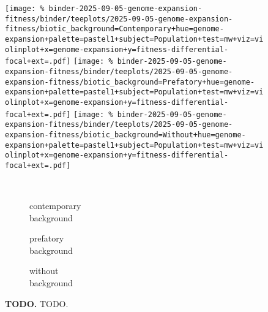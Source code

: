 \begin{figure}

\texttt{[image: \%
binder-2025-09-05-genome-expansion-fitness/binder/teeplots/2025-09-05-genome-expansion-fitness/biotic\_background=Contemporary+hue=genome-expansion+palette=pastel1+subject=Population+test=mw+viz=violinplot+x=genome-expansion+y=fitness-differential-focal+ext=.pdf]}
\texttt{[image: \%
binder-2025-09-05-genome-expansion-fitness/binder/teeplots/2025-09-05-genome-expansion-fitness/biotic\_background=Prefatory+hue=genome-expansion+palette=pastel1+subject=Population+test=mw+viz=violinplot+x=genome-expansion+y=fitness-differential-focal+ext=.pdf]}%
\texttt{[image: \%
binder-2025-09-05-genome-expansion-fitness/binder/teeplots/2025-09-05-genome-expansion-fitness/biotic\_background=Without+hue=genome-expansion+palette=pastel1+subject=Population+test=mw+viz=violinplot+x=genome-expansion+y=fitness-differential-focal+ext=.pdf]}

\vspace{-1ex}

\begin{subfigure}{0.135\linewidth}
~
\end{subfigure}%
\begin{subfigure}{0.305\linewidth}
    \centering
    \caption{\footnotesize contemporary\\background}
    \label{fig:genome-expansion-population:contemporary}
\end{subfigure}%
\begin{subfigure}{0.305\linewidth}
    \centering
    \caption{\footnotesize prefatory\\background}
    \label{fig:genome-expansion-population:prefatory}
\end{subfigure}%
\begin{subfigure}{0.255\linewidth}
    \centering
    \caption{\footnotesize without\\background}
    \label{fig:genome-expansion-population:without}
\end{subfigure}

\caption{
    \textbf{TODO.}
    \footnotesize
    TODO.
}
\label{fig:genome-expansion-population}

\end{figure}
